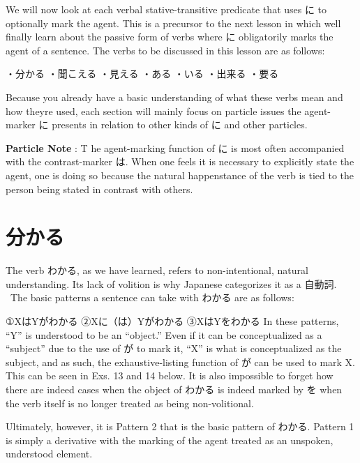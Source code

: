 \par{ We will now look at each verbal stative-transitive predicate that uses に to optionally mark the agent. This is a precursor to the next lesson in which we\textquotesingle ll finally learn about the passive form of verbs where に obligatorily marks the agent of a sentence. The verbs to be discussed in this lesson are as follows: }

\par{・分かる \hfill\break
・聞こえる \hfill\break
・見える \hfill\break
・ある \hfill\break
・いる \hfill\break
・出来る \hfill\break
・要る }

\par{ Because you already have a basic understanding of what these verbs mean and how they\textquotesingle re used, each section will mainly focus on particle issues the agent-marker に presents in relation to other kinds of に and other particles. }

\par{\textbf{Particle Note }: T he agent-marking function of に is most often accompanied with the contrast-marker は. When one feels it is necessary to explicitly state the agent, one is doing so because the natural happenstance of the verb is tied to the person being stated in contrast with others. }
      
\section{分かる}
 
\par{ The verb わかる, as we have learned, refers to non-intentional, natural understanding. Its lack of volition is why Japanese categorizes it as a 自動詞.  The basic patterns a sentence can take with わかる are as follows: }

\par{①XはYがわかる \hfill\break
②Xに（は）Yがわかる \hfill\break
③XはYをわかる \hfill\break
 \hfill\break
 In these patterns, “Y” is understood to be an “object.” Even if it can be conceptualized as a “subject” due to the use of が to mark it, “X” is what is conceptualized as the subject, and as such, the exhaustive-listing function of が can be used to mark X. This can be seen in Exs. 13 and 14 below. It is also impossible to forget how there are indeed cases when the object of わかる is indeed marked by を when the verb itself is no longer treated as being non-volitional. }

\par{ Ultimately, however, it is Pattern 2 that is the basic pattern of わかる. Pattern 1 is simply a derivative with the marking of the agent treated as an unspoken, understood element. }

